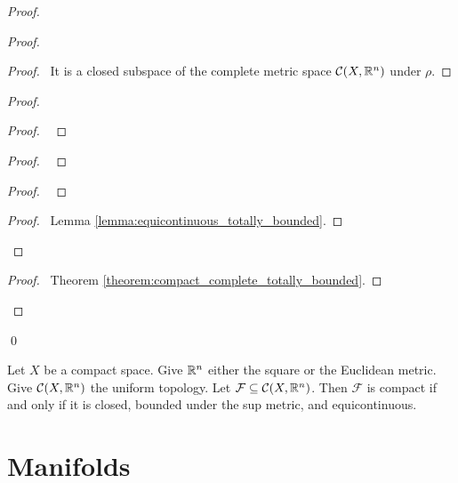 \begin{proof}
    \begin{proof}
        \begin{proof}
            \pf\ It is a closed subspace of the complete metric space $\mathcal{C}(X, \mathbb{R}^n)$ under $\rho$.
        \end{proof}
        \begin{proof}
            \begin{proof}
                \pf\ 
            \end{proof}
            \begin{proof}
                \pf\ 
            \end{proof}
            \begin{proof}
                \pf\ 
            \end{proof}
            \begin{proof}
                \pf\ Lemma \ref{lemma:equicontinuous_totally_bounded}.
            \end{proof}
        \end{proof}
        \begin{proof}
            \pf\ Theorem \ref{theorem:compact_complete_totally_bounded}.
        \end{proof}
    \end{proof}
    \qed
\end{proof}

\begin{corollary}
    Let $X$ be a compact space. Give $\mathbb{R}^n$ either the square or the Euclidean metric. Give $\mathcal{C}(X, \mathbb{R}^n)$ the uniform topology.
    Let $\mathcal{F} \subseteq \mathcal{C}(X, \mathbb{R}^n)$. Then $\mathcal{F}$ is compact if and only if it is closed, bounded under the
    sup metric, and equicontinuous.
\end{corollary}

\chapter{Manifolds}

